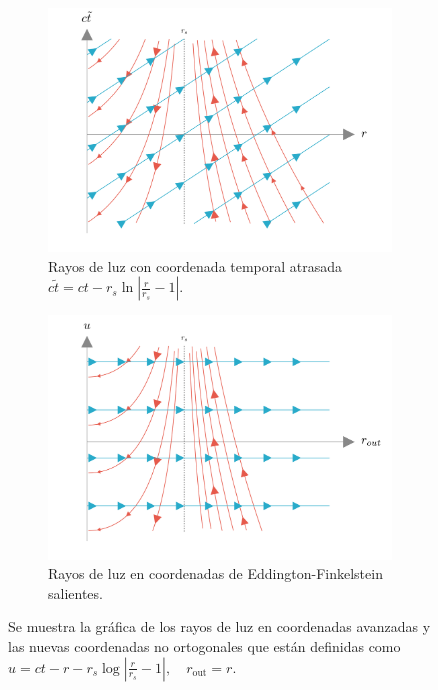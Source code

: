 \begin{figure}[H]
    \centering
    \begin{subfigure}{0.48\textwidth}
        \includegraphics[width=\linewidth]{AgujerosNegros/Schwarzschild/media/images/EddingtonFinkelsteinOutgoingLight_ManimCE_v0.19.0.png}
        \caption{Rayos de luz con coordenada temporal atrasada $ c \tilde{t} = ct - r_s \ln \left| \frac{r}{r_s} - 1 \right|$.}
    \end{subfigure}
    \hfill
    \begin{subfigure}{0.48\textwidth}
        \includegraphics[width=\linewidth]{AgujerosNegros/Schwarzschild/media/images/EddingtonFinkelsteinUR_ManimCE_v0.19.0.png}
        \caption{Rayos de luz en coordenadas de Eddington-Finkelstein salientes.}
    \end{subfigure}
    \caption{Se muestra la gráfica de los rayos de luz en coordenadas avanzadas y las nuevas coordenadas no ortogonales que están definidas como $u = ct - r - r_s \log \left| \frac{r}{r_s} - 1 \right|, \quad r_{\text{out}} = r$.}
\end{figure}

